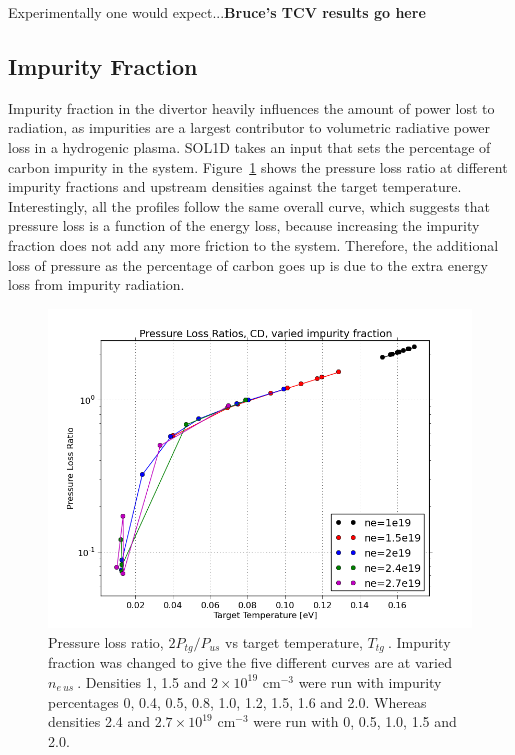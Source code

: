 \documentclass[11pt]{article}  %
\providecommand{\noNe}[1]{{${#1}\times 10^{19}$ cm$^{-3}$}} %
\providecommand{\neus}{$n_{e~us}~$} %
\providecommand{\Ttg}{$T_{tg}~$} %
\begin{document}
Experimentally one would expect...\textbf{Bruce's TCV results go here}





\subsection{Impurity Fraction}\label{ssecImpfrac}
Impurity fraction in the divertor heavily influences the amount of power lost to radiation, as impurities are a largest contributor to volumetric radiative power loss in a hydrogenic plasma. SOL1D takes an input that sets the percentage of carbon impurity in the system. Figure~\ref{figCvarPL5nes} shows the pressure loss ratio at different impurity fractions and upstream densities against the target temperature. Interestingly, all the profiles follow the same overall curve, which suggests that pressure loss is a function of the energy loss, because increasing the impurity fraction does not add any more friction to the system. Therefore, the additional loss of pressure as the percentage of carbon goes up is due to the extra energy loss from impurity radiation.

\begin{figure}
\includegraphics[scale=0.5]{Figures/sol1d/CvarPL5nes.png}
\centering
\caption{Pressure loss ratio, $2P_{tg}/P_{us}$ vs target temperature, \Ttg. Impurity fraction was changed to give the five different curves are at varied \neus. Densities 1, 1.5 and \noNe{2} were run with impurity percentages 0, 0.4, 0.5, 0.8, 1.0, 1.2, 1.5, 1.6 and 2.0. Whereas densities 2.4 and \noNe{2.7} were run with 0, 0.5, 1.0, 1.5 and 2.0.}\label{figCvarPL5nes}
\end{figure}
\end{document}
